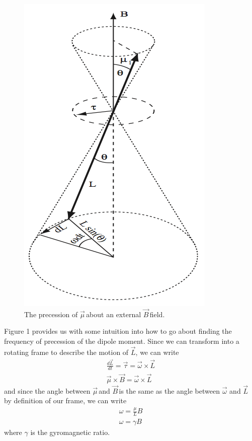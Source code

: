 \documentclass{article}
\newcommand{\dipole}{$\vec{\mu}\,$}
\newcommand{\B}{$\vec{B}\,$}
\begin{document}
	\begin{figure}[!htb]
		\centering
		\includegraphics[scale=.5]{../figures/torque}
		\caption{The precession of \dipole about an external \B field.}
	\end{figure}

	Figure 1 provides us with some intuition into how to go about finding the frequency of precession of the dipole moment.  Since we can transform into a rotating frame to describe the motion of $\vec{L}$, we can write
	\begin{gather*}
		\frac{d\vec{L}}{dt} = \vec{\tau} = \vec{\omega} \times \vec{L}\\
		\vec{\mu} \times \vec{B} = \vec{\omega} \times \vec{L}
	\end{gather*}
	and since the angle between \dipole and \B is the same as the angle between $\vec{\omega}$ and $\vec{L}$ by definition of our frame, we can write 
	\begin{gather}
		\omega = \frac{\mu}{L}B\\
		\omega = \gamma B
	\end{gather}
	where $\gamma$ is the gyromagnetic ratio.
\end{document}
